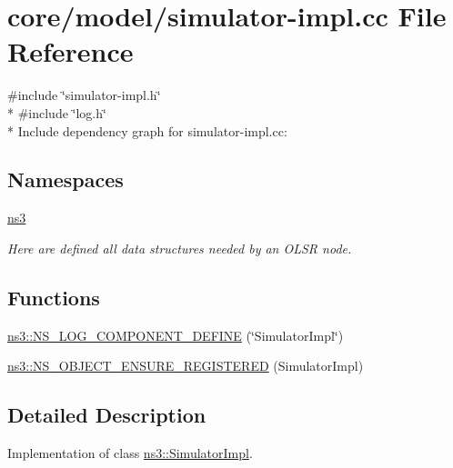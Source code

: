 \hypertarget{simulator-impl_8cc}{}\section{core/model/simulator-\/impl.cc File Reference}
\label{simulator-impl_8cc}
{\ttfamily \#include \char`\"{}simulator-\/impl.\+h\char`\"{}}\\*
{\ttfamily \#include \char`\"{}log.\+h\char`\"{}}\\*
Include dependency graph for simulator-\/impl.cc\+:
\subsection*{Namespaces}
\begin{DoxyCompactItemize}
\item 
 \hyperlink{namespacens3}{ns3}
\begin{DoxyCompactList}\small\item\em Here are defined all data structures needed by an O\+L\+SR node. \end{DoxyCompactList}\end{DoxyCompactItemize}
\subsection*{Functions}
\begin{DoxyCompactItemize}
\item 
\hyperlink{namespacens3_a87fc7082ebb0366ffb3e73a18f0ec435}{ns3\+::\+N\+S\+\_\+\+L\+O\+G\+\_\+\+C\+O\+M\+P\+O\+N\+E\+N\+T\+\_\+\+D\+E\+F\+I\+NE} (\char`\"{}Simulator\+Impl\char`\"{})
\item 
\hyperlink{namespacens3_ac5d439298ce68902ffefd82904de924c}{ns3\+::\+N\+S\+\_\+\+O\+B\+J\+E\+C\+T\+\_\+\+E\+N\+S\+U\+R\+E\+\_\+\+R\+E\+G\+I\+S\+T\+E\+R\+ED} (Simulator\+Impl)
\end{DoxyCompactItemize}


\subsection{Detailed Description}
Implementation of class \hyperlink{classns3_1_1SimulatorImpl}{ns3\+::\+Simulator\+Impl}. 